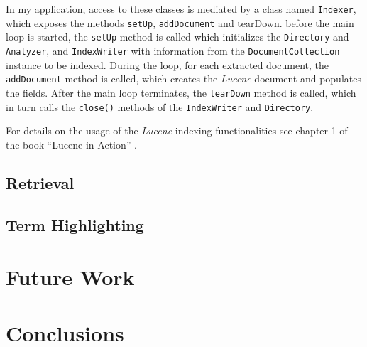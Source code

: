 \documentclass[a4paper]{usiinfbachelorproject}
\begin{document}
In my application, access to these classes is mediated by a class named \texttt{Indexer}, which exposes the methods
\texttt{setUp}, \texttt{addDocument} and tearDown. before the main loop is started, the \texttt{setUp} method is called which
initializes the \texttt{Directory} and \texttt{Analyzer}, and \texttt{IndexWriter} with information from
the \texttt{DocumentCollection} instance to be indexed. During the loop, for each extracted document, the
\texttt{addDocument} method is called, which creates the \emph{Lucene} document and populates the fields.
After the main loop terminates, the \texttt{tearDown} method is called, which
in turn calls the \texttt{close()} methods of the \texttt{IndexWriter} and \texttt{Directory}.

For details on the usage of the \emph{Lucene} indexing functionalities see chapter 1 of the book
``Lucene in Action'' \cite{luceneInAction}.


\subsection{\textbf{Retrieval}} \label{sec:implRetrieval}


\subsection{\textbf{Term Highlighting}} \label{sec:implRetrieval}




\section{\textbf{Future Work}} \label{sec:futureWork}


\section{\textbf{Conclusions}} \label{sec:conclusions}


\newpage

\end{document}
